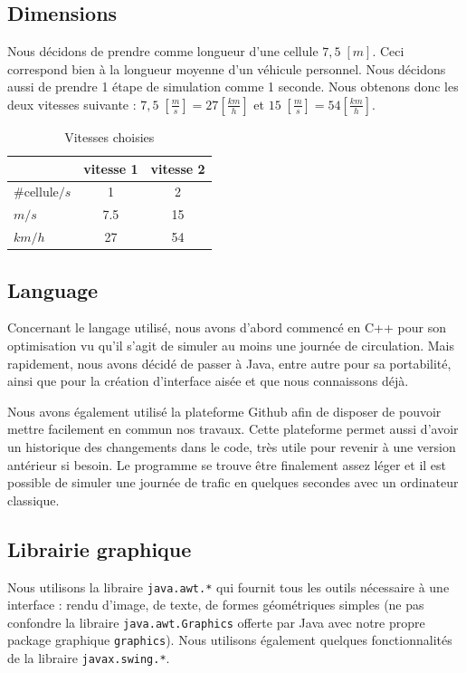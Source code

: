 \documentclass[a4paper,11pt, titlepage]{extarticle}
\begin{document}
\subsection{Dimensions}

Nous décidons de prendre comme longueur d'une cellule $7,5 \; [m]$. Ceci correspond bien à la longueur moyenne d'un véhicule personnel. Nous décidons aussi de prendre 1 étape de simulation comme 1 seconde. Nous obtenons donc les deux vitesses suivante : $7,5 \; [\frac{m}{s}] = 27 [\frac{km}{h}]$ et $15 \; [\frac{m}{s}] = 54 [\frac{km}{h}]$.

\begin{table}[h!]
\begin{center}
\begin{tabular}{|l|c|c|}
\hline
 & vitesse 1 & vitesse 2 \\ \hline
\#cellule$/s$& 1 & 2 \\ \hline
$m/s$ & 7.5 & 15 \\ \hline\hline
$km/h$ & 27 & 54 \\ \hline
\end{tabular}
\end{center}
\caption{Vitesses choisies}
\label{tabSpeed}
\end{table}

\subsection{Language}

Concernant le langage utilisé, nous avons d'abord commencé en C++ pour son optimisation vu qu'il s'agit de simuler au moins une journée de circulation. Mais rapidement, nous avons décidé de passer à Java, entre autre pour sa portabilité, ainsi que pour la création d'interface aisée et que nous connaissons déjà.

Nous avons également utilisé la plateforme Github afin de disposer de pouvoir mettre facilement en commun nos travaux. Cette plateforme permet aussi d'avoir un historique des changements dans le code, très utile pour revenir à une version antérieur si besoin. Le programme se trouve être finalement assez léger et il est possible de simuler une journée de trafic en quelques secondes avec un ordinateur classique.

\subsection{Librairie graphique}

Nous utilisons la libraire \texttt{java.awt.*} qui fournit tous les outils nécessaire à une interface : rendu d'image, de texte, de formes géométriques simples (ne pas confondre la libraire \texttt{java.awt.Graphics} offerte par Java avec notre propre package graphique \texttt{graphics}). Nous utilisons également quelques fonctionnalités de la libraire \texttt{javax.swing.*}.
\end{document}
